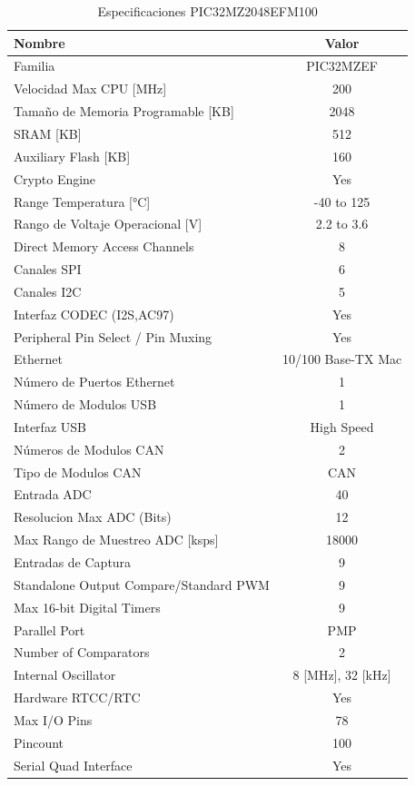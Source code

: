 \documentclass[letterpaper,12pt,oneside]{book}
\begin{document}
		\begin{table}[!htpb]
				\centering
				\begin{tabular}{ l | c }
					\textbf{Nombre} & \textbf{Valor} \\
					\hline
					Familia & PIC32MZEF \\
					\hline
					Velocidad Max CPU [MHz] & 200 \\
					\hline
					Tamaño de Memoria Programable [KB] & 2048 \\
					\hline
					SRAM [KB] & 512\\
					\hline
					Auxiliary Flash [KB] & 160 \\
					\hline
					Crypto Engine & Yes \\
					\hline
					Range Temperatura [°C] & -40 to 125 \\
					\hline
					Rango de Voltaje Operacional [V] & 2.2 to 3.6 \\
					\hline
					Direct Memory Access Channels & 8 \\
					\hline
					Canales SPI & 6 \\
					\hline
					Canales I2C & 5 \\
					\hline
					Interfaz CODEC (I2S,AC97) & Yes \\
					\hline
					Peripheral Pin Select / Pin Muxing & Yes \\
					\hline
					Ethernet & 10/100 Base-TX Mac \\
					\hline
					Número de Puertos Ethernet  & 1 \\
					\hline
					Número de Modulos USB & 1 \\
					\hline
					Interfaz USB & High Speed \\
					\hline
					Números de Modulos CAN & 2 \\
					\hline
					Tipo de Modulos CAN & CAN \\
					\hline
					Entrada ADC & 40 \\
					\hline
					Resolucion Max ADC (Bits) & 12 \\
					\hline
					Max Rango de Muestreo ADC [ksps] & 18000 \\
					\hline
					Entradas de Captura & 9 \\
					\hline
					Standalone Output Compare/Standard PWM & 9 \\
					\hline
					Max 16-bit Digital Timers & 9 \\
					\hline
					Parallel Port & PMP \\
					\hline
					Number of Comparators & 2 \\
					\hline
					Internal Oscillator & 8 [MHz], 32 [kHz] \\
					\hline
					Hardware RTCC/RTC & Yes \\
					\hline
					Max I/O Pins & 78 \\
					\hline
					Pincount & 100 \\
					\hline
					Serial Quad Interface & Yes \\
				\end{tabular}
				\caption{Especificaciones PIC32MZ2048EFM100}
		\end{table}
\end{document}

